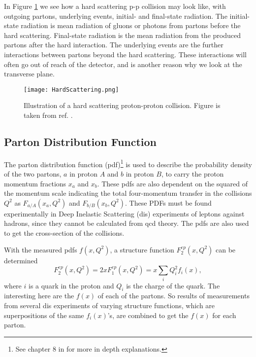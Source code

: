 \documentclass[a4paper, american, 12pt]{report}
\begin{document}
	In Figure \ref{fig:HardScattering} we see how a hard scattering p-p collision may look like, with outgoing partons, underlying events, initial- and final-state radiation. The initial-state radiation is mean radiation of gluons or photons from partons before the hard scattering. Final-state radiation is the mean radiation from the produced partons after the hard interaction. The underlying events are the further interactions between partons beyond the hard scattering. These interactions will often go out of reach of the detector, and is another reason why we look at the transverse plane.
	\begin{figure}[htbp!]
		\hspace*{-1.0cm}
		\centering\texttt{[image: HardScattering.png]}
		\caption[Hard scattering.]{Illustration of a hard scattering proton-proton collision. Figure is taken from ref. \cite{field2002hardscattering}. \label{fig:HardScattering}}
	\end{figure} 
	
	
	\subsection{Parton Distribution Function}
	\label{subsect:Theory-PartonDF}
	The parton distribution function (\acrshort{pdf})\footnote{See chapter 8 in \citet{thomson2013modern} for more in depth explanations.}  is used to describe the probability density of the two partons, $a$ in proton $A$ and $b$ in proton $B$, to carry the proton momentum fractions $x_a$ and $x_b$. These \acrshort{pdf}s are also dependent on the squared of the momentum scale indicating the total four-momentum transfer in the collisions $Q^2$ as $F_{a/A}(x_a,Q^2)$ and $F_{b/B}(x_b,Q^2)$. These PDFs must be found experimentally in Deep Inelastic Scattering (\acrshort{dis}) experiments of leptons against hadrons, since they cannot be calculated from \acrshort{qcd} theory. The \acrshort{pdf}s are also used to get the cross-section of the collisions. 
	
	With the measured \acrshort{pdf}s $f(x,Q^2)$, a structure function $F_2^{ep}(x,Q^2)$ can be determined
	\begin{equation}
	\label{eq:Structure_function}
	F_2^{ep}(x,Q^2)=2xF_1^{ep}(x,Q^2)=x\sum_{i}Q_i^2f_i(x),
	\end{equation}
	where $i$ is a quark in the proton and $Q_i$ is the charge of the quark. The interesting here are the $f(x)$ of each of the partons. So results of measurements from several \acrshort{dis} experiments of varying structure functions, which are superpositions of the same $f_i(x)$'s, are combined to get the $f(x)$ for each parton.
		
\end{document}
